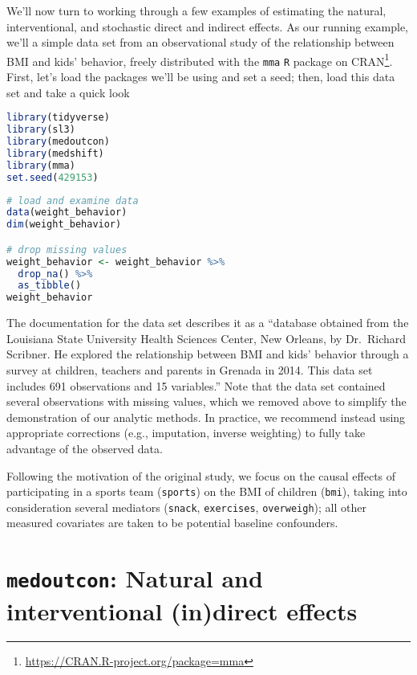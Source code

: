 \documentclass[
  12pt,
]{book}
\newcommand{\passthrough}[1]{#1}
\renewcommand{\href}[2]{#2\footnote{\url{#1}}}
\theoremstyle{definition}
\theoremstyle{definition}
\theoremstyle{definition}
\newcommand{\1}{\mathbbm{1}}
\begin{document}
We'll now turn to working through a few examples of estimating the natural,
interventional, and stochastic direct and indirect effects. As our running
example, we'll a simple data set from an observational study of the relationship
between BMI and kids' behavior, freely distributed with the \href{https://CRAN.R-project.org/package=mma}{\passthrough{\lstinline!mma!} \passthrough{\lstinline!R!} package
on CRAN}. First, let's load the packages
we'll be using and set a seed; then, load this data set and take a quick look

\begin{lstlisting}[language=R]
library(tidyverse)
library(sl3)
library(medoutcon)
library(medshift)
library(mma)
set.seed(429153)
\end{lstlisting}

\begin{lstlisting}[language=R]
# load and examine data
data(weight_behavior)
dim(weight_behavior)

# drop missing values
weight_behavior <- weight_behavior %>%
  drop_na() %>%
  as_tibble()
weight_behavior
\end{lstlisting}

The documentation for the data set describes it as a ``database obtained from the
Louisiana State University Health Sciences Center, New Orleans, by Dr.~Richard
Scribner. He explored the relationship between BMI and kids' behavior through a
survey at children, teachers and parents in Grenada in 2014. This data set
includes 691 observations and 15 variables.'' Note that the data set contained
several observations with missing values, which we removed above to simplify the
demonstration of our analytic methods. In practice, we recommend instead using
appropriate corrections (e.g., imputation, inverse weighting) to fully take
advantage of the observed data.

Following the motivation of the original study, we focus on the causal effects
of participating in a sports team (\passthrough{\lstinline!sports!}) on the BMI of children (\passthrough{\lstinline!bmi!}),
taking into consideration several mediators (\passthrough{\lstinline!snack!}, \passthrough{\lstinline!exercises!}, \passthrough{\lstinline!overweigh!});
all other measured covariates are taken to be potential baseline confounders.

\hypertarget{medoutcon-natural-and-interventional-indirect-effects}{%
\section{\texorpdfstring{\texttt{medoutcon}: Natural and interventional (in)direct effects}{medoutcon: Natural and interventional (in)direct effects}}\label{medoutcon-natural-and-interventional-indirect-effects}}
\end{document}
